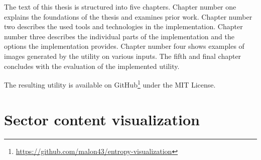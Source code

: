 \documentclass[
  digital, %
  color,   %
  oneside, %
  lof,     %
  nolot,     %
]{fithesis4}
\def\textrussian#1{{\usefont{T2A}{PTSerif-TLF}{m}{rm}#1}}
\begin{document}
The text of this thesis is structured into five chapters.
Chapter number one explains the foundations of the thesis and examines prior work.
Chapter number two describes the used tools and technologies in the implementation.
Chapter number three describes the individual parts of the implementation and the options the implementation provides.
Chapter number four shows examples of images generated by the utility on various inputs.
The fifth and final chapter concludes with the evaluation of the implemented utility.

The resulting utility is available on GitHub\footnote{\url{https://github.com/malon43/entropy-visualization}} under the MIT License.





\chapter{Sector content visualization}
\label{chap:sector-content-visualization}
\end{document}
